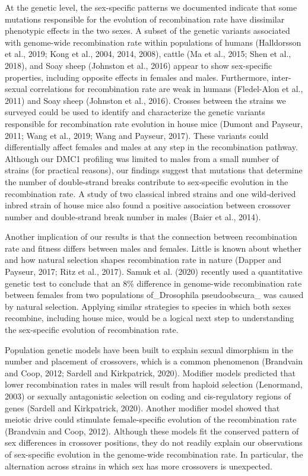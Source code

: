 \documentclass[
]{article}
\begin{document}
At the genetic level, the sex-specific patterns we documented indicate
that some mutations responsible for the evolution of recombination rate
have dissimilar phenotypic effects in the two sexes. A subset of the
genetic variants associated with genome-wide recombination rate within
populations of humans (Halldorsson et al., 2019; Kong et al., 2004,
2014, 2008), cattle (Ma et al., 2015; Shen et al., 2018), and Soay sheep
(Johnston et al., 2016) appear to show sex-specific properties,
including opposite effects in females and males. Furthermore,
inter-sexual correlations for recombination rate are weak in humans
(Fledel-Alon et al., 2011) and Soay sheep (Johnston et al., 2016).
Crosses between the strains we surveyed could be used to identify and
characterize the genetic variants responsible for recombination rate
evolution in house mice (Dumont and Payseur, 2011; Wang et al., 2019;
Wang and Payseur, 2017). These variants could differentially affect
females and males at any step in the recombination pathway. Although our
DMC1 profiling was limited to males from a small number of strains (for
practical reasons), our findings suggest that mutations that determine
the number of double-strand breaks contribute to sex-specific evolution
in the recombination rate. A study of two classical inbred strains and
one wild-derived inbred strain of house mice also found a positive
association between crossover number and double-strand break number in
males (Baier et al., 2014).

Another implication of our results is that the connection between
recombination rate and fitness differs between males and females. Little
is known about whether and how natural selection shapes recombination
rate in nature (Dapper and Payseur, 2017; Ritz et al., 2017). Samuk et
al. (2020) recently used a quantitative genetic test to conclude that an
8\% difference in genome-wide recombination rate between females from
two populations of\_Drosophila pseudoobscura\_ was caused by natural
selection. Applying similar strategies to species in which both sexes
recombine, including house mice, would be a logical next step to
understanding the sex-specific evolution of recombination rate.

Population genetic models have been built to explain sexual dimorphism
in the number and placement of crossovers, which is a common phenomenon
(Brandvain and Coop, 2012; Sardell and Kirkpatrick, 2020). Modifier
models predicted that lower recombination rates in males will result
from haploid selection (Lenormand, 2003) or sexually antagonistic
selection on coding and cis-regulatory regions of genes (Sardell and
Kirkpatrick, 2020). Another modifier model showed that meiotic drive
could stimulate female-specific evolution of the recombination rate
(Brandvain and Coop, 2012). Although these models fit the conserved
pattern of sex differences in crossover positions, they do not readily
explain our observations of sex-specific evolution in the genome-wide
recombination rate. In particular, the alternation across strains in
which sex has more crossovers is unexpected.
\end{document}

